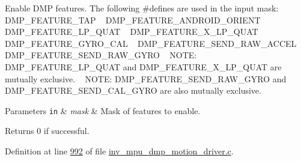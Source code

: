Enable D\+MP features. The following \#define\textquotesingle{}s are used in the input mask\+: ~\newline
 D\+M\+P\+\_\+\+F\+E\+A\+T\+U\+R\+E\+\_\+\+T\+AP ~\newline
 D\+M\+P\+\_\+\+F\+E\+A\+T\+U\+R\+E\+\_\+\+A\+N\+D\+R\+O\+I\+D\+\_\+\+O\+R\+I\+E\+NT ~\newline
 D\+M\+P\+\_\+\+F\+E\+A\+T\+U\+R\+E\+\_\+\+L\+P\+\_\+\+Q\+U\+AT ~\newline
 D\+M\+P\+\_\+\+F\+E\+A\+T\+U\+R\+E\+\_\+X\+\_\+\+L\+P\+\_\+\+Q\+U\+AT ~\newline
 D\+M\+P\+\_\+\+F\+E\+A\+T\+U\+R\+E\+\_\+\+G\+Y\+R\+O\+\_\+\+C\+AL ~\newline
 D\+M\+P\+\_\+\+F\+E\+A\+T\+U\+R\+E\+\_\+\+S\+E\+N\+D\+\_\+\+R\+A\+W\+\_\+\+A\+C\+C\+EL ~\newline
 D\+M\+P\+\_\+\+F\+E\+A\+T\+U\+R\+E\+\_\+\+S\+E\+N\+D\+\_\+\+R\+A\+W\+\_\+\+G\+Y\+RO ~\newline
 N\+O\+TE\+: D\+M\+P\+\_\+\+F\+E\+A\+T\+U\+R\+E\+\_\+\+L\+P\+\_\+\+Q\+U\+AT and D\+M\+P\+\_\+\+F\+E\+A\+T\+U\+R\+E\+\_\+X\+\_\+\+L\+P\+\_\+\+Q\+U\+AT are mutually exclusive. ~\newline
 N\+O\+TE\+: D\+M\+P\+\_\+\+F\+E\+A\+T\+U\+R\+E\+\_\+\+S\+E\+N\+D\+\_\+\+R\+A\+W\+\_\+\+G\+Y\+RO and D\+M\+P\+\_\+\+F\+E\+A\+T\+U\+R\+E\+\_\+\+S\+E\+N\+D\+\_\+\+C\+A\+L\+\_\+\+G\+Y\+RO are also mutually exclusive. 


\begin{DoxyParams}[1]{Parameters}
\mbox{\tt in}  & {\em mask} & Mask of features to enable. \\
\hline
\end{DoxyParams}
\begin{DoxyReturn}{Returns}
0 if successful. 
\end{DoxyReturn}


Definition at line \hyperlink{inv__mpu__dmp__motion__driver_8c_source_l00992}{992} of file \hyperlink{inv__mpu__dmp__motion__driver_8c_source}{inv\+\_\+mpu\+\_\+dmp\+\_\+motion\+\_\+driver.\+c}.


